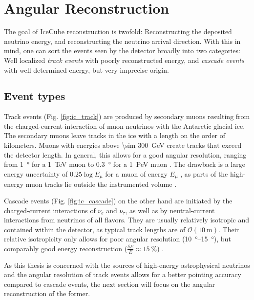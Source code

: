 \documentclass[
    a4paper, %
    fontsize=10pt, %
    twoside=false, %
    numbers=noenddot, %
    fontmethod=tex,
]{kaobook}
\begin{document}
\section{Angular Reconstruction}\label{reconstruction}

The goal of IceCube reconstruction is twofold: Reconstructing the deposited neutrino energy, and reconstructing the neutrino arrival direction. With this in mind, one can sort the events seen by the detector broadly into two categories: Well localized \textit{track events} with poorly reconstructed energy, and \textit{cascade events} with well-determined energy, but very imprecise origin.

\subsection{Event types}

Track events (Fig. \ref{fig:ic_track}) are produced by secondary muons resulting from the charged-current interaction of muon neutrinos with the Antarctic glacial ice. The secondary muons leave tracks in the ice with a length on the order of kilometers. Muons with energies above \SI{\sim 300}{\giga\eV} create tracks that exceed the detector length. In general, this allows for a good angular resolution, ranging from \SI{1}{\degree} for a \SI{1}{\TeV} muon to \SI{0.3}{\degree} for a \SI{1}{\peta\eV} muon . The drawback is a large energy uncertainty of $0.25 \log{E_\mu}$ for a muon of energy $E_\mu$ , as parts of the high-energy muon tracks lie outside the instrumented volume .

Cascade events (Fig. \ref{fig:ic_cascade}) on the other hand are initiated by the charged-current interactions of $\nu_e$ and $\nu_\tau$, as well as by neutral-current interactions from neutrinos of all flavors. They are usually relatively isotropic and contained within the detector, as typical track lengths are of $\mathcal{O}(\SI{10}{\meter})$. Their relative isotropicity only allows for poor angular resolution (\SIrange{10}{15}{\degree}), but comparably good energy reconstruction ($\frac{\delta E}{E} \approx \SI{15}{\percent}$) \cite{Aartsen2017a}.

As this thesis is concerned with the sources of high-energy astrophysical neutrinos and the angular resolution of track events allows for a better pointing accuracy compared to cascade events, the next section will focus on the angular reconstruction of the former.
\end{document}
